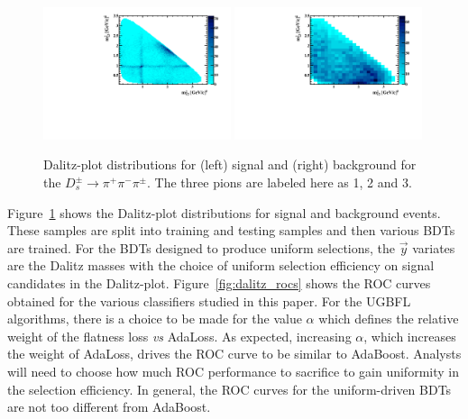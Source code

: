 \begin{figure}[] 
  \centering 
  \includegraphics[width=0.49\textwidth]{DP_sig.pdf}
  \includegraphics[width=0.49\textwidth]{DP_bkgd.pdf}
  \caption{\label{fig:dalitz} Dalitz-plot distributions for (left) signal and (right) background for the $D_s^\pm\to\pi^+\pi^-\pi^\pm$.  The three pions are labeled here as 1, 2 and 3.}
\end{figure}

Figure~\ref{fig:dalitz} shows the Dalitz-plot distributions for signal and background events.  These samples are split into training and testing samples and then various BDTs are trained.  For the BDTs designed to produce uniform selections, the $\vec{y}$ variates are the Dalitz masses with the choice of uniform selection efficiency on signal candidates in the Dalitz-plot.  
Figure~\ref{fig:dalitz_rocs} shows the ROC curves obtained for the various classifiers studied in this paper.  For the UGBFL algorithms, there is a choice to be made for the value $\alpha$ which defines the relative weight of the flatness loss {\em vs} AdaLoss.  As expected, increasing $\alpha$, which increases the weight of AdaLoss, drives the ROC curve to be similar to AdaBoost.  Analysts will need to choose how much ROC performance to sacrifice to gain uniformity in the selection efficiency.  In general, the ROC curves for the uniform-driven BDTs are not too different from AdaBoost.  



